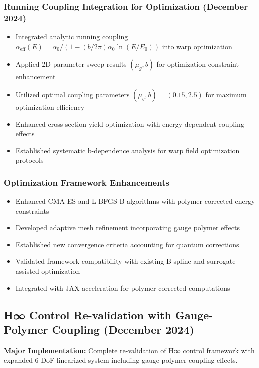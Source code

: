 \documentclass[11pt]{article}
\begin{document}
\subsubsection{Running Coupling Integration for Optimization (December 2024)}
\begin{itemize}
    \item Integrated analytic running coupling $\alpha_{\text{eff}}(E) = \alpha_0/(1 - (b/2\pi)\alpha_0 \ln(E/E_0))$ into warp optimization
    \item Applied 2D parameter sweep results $(\mu_g, b)$ for optimization constraint enhancement
    \item Utilized optimal coupling parameters $(\mu_g, b) = (0.15, 2.5)$ for maximum optimization efficiency
    \item Enhanced cross-section yield optimization with energy-dependent coupling effects
    \item Established systematic b-dependence analysis for warp field optimization protocols
\end{itemize}

\subsubsection{Optimization Framework Enhancements}
\begin{itemize}
    \item Enhanced CMA-ES and L-BFGS-B algorithms with polymer-corrected energy constraints
    \item Developed adaptive mesh refinement incorporating gauge polymer effects
    \item Established new convergence criteria accounting for quantum corrections
    \item Validated framework compatibility with existing B-spline and surrogate-assisted optimization    \item Integrated with JAX acceleration for polymer-corrected computations
\end{itemize}

\subsection{H∞ Control Re-validation with Gauge-Polymer Coupling (December 2024)}

\textbf{Major Implementation:} Complete re-validation of H∞ control framework with expanded 6-DoF linearized system including gauge-polymer coupling effects.
\end{document}
